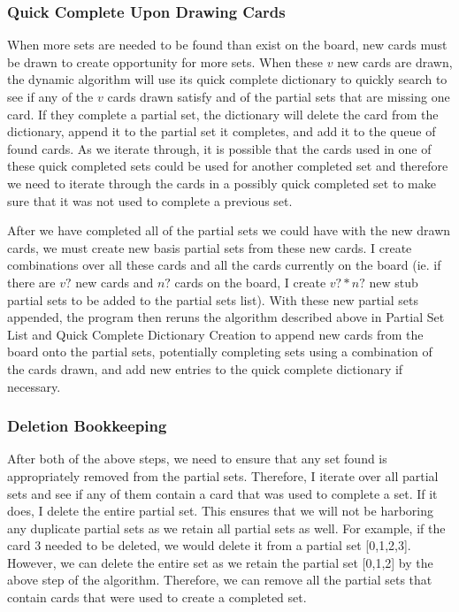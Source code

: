 \documentclass[pageno]{jpaper}
\begin{document}
\subsubsection{Quick Complete Upon Drawing Cards}


When more sets are needed to be found than exist on the board, new cards must be drawn to create opportunity for more sets. When these $v$ new cards are drawn, the dynamic algorithm will use its quick complete dictionary to quickly search to see if any of the $v$ cards drawn satisfy and of the partial sets that are missing one card. If they complete a partial set, the dictionary will delete the card from the dictionary, append it to the partial set it completes, and add it to the queue of found cards. As we iterate through, it is possible that the cards used in one of these quick completed sets could be used for another completed set and therefore we need to iterate through the cards in a possibly quick completed set to make sure that it was not used to complete a previous set. 

After we have completed all of the partial sets we could have with the new drawn cards, we must create new basis partial sets from these new cards. I create combinations over all these cards and all the cards currently on the board (ie. if there are $v?$ new cards and $n?$ cards on the board, I create $v?*n?$ new stub partial sets to be added to the partial sets list). With these new partial sets appended, the program then reruns the algorithm described above in Partial Set List and Quick Complete Dictionary Creation to append new cards from the board onto the partial sets, potentially completing sets using a combination of the cards drawn, and add new entries to the quick complete dictionary if necessary. 

\subsubsection{Deletion Bookkeeping}

After both of the above steps, we need to ensure that any set found is appropriately removed from the partial sets. Therefore, I iterate over all partial sets and see if any of them contain a card that was used to complete a set. If it does, I delete the entire partial set. This ensures that we will not be harboring any duplicate partial sets as we retain all partial sets as well. For example, if the card 3 needed to be deleted, we would delete it from a partial set [0,1,2,3]. However, we can delete the entire set as we retain the partial set [0,1,2] by the above step of the algorithm. Therefore, we can remove all the partial sets that contain cards that were used to create a completed set.
\end{document}
